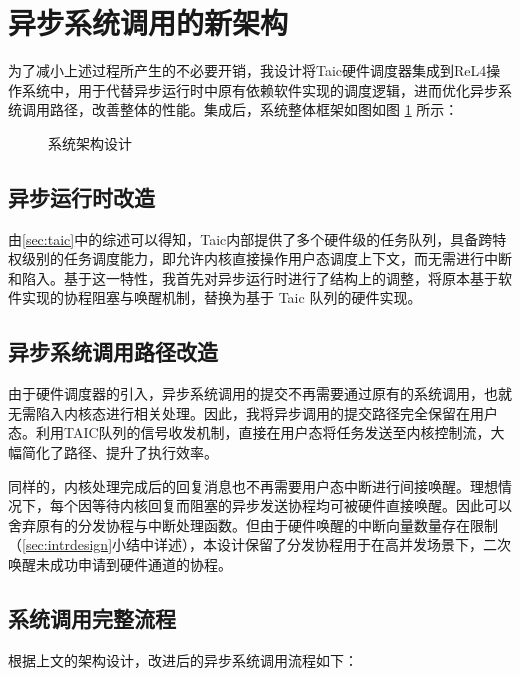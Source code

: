\section{异步系统调用的新架构}

为了减小上述过程所产生的不必要开销，我设计将Taic硬件调度器集成到ReL4操作系统中，用于代替异步运行时中原有依赖软件实现的调度逻辑，进而优化异步系统调用路径，改善整体的性能。集成后，系统整体框架如图如图 \ref{taicsyscall} 所示：

\begin{figure}[htbp]
    \centering
    
    \caption{系统架构设计}\label{taicsyscall}
\end{figure}

\subsection{异步运行时改造}

由\ref{sec:taic}中的综述可以得知，Taic内部提供了多个硬件级的任务队列，具备跨特权级别的任务调度能力，即允许内核直接操作用户态调度上下文，而无需进行中断和陷入。基于这一特性，我首先对异步运行时进行了结构上的调整，将原本基于软件实现的协程阻塞与唤醒机制，替换为基于 Taic 队列的硬件实现。


\subsection{异步系统调用路径改造}

由于硬件调度器的引入，异步系统调用的提交不再需要通过原有的系统调用，也就无需陷入内核态进行相关处理。因此，我将异步调用的提交路径完全保留在用户态。利用TAIC队列的信号收发机制，直接在用户态将任务发送至内核控制流，大幅简化了路径、提升了执行效率。

同样的，内核处理完成后的回复消息也不再需要用户态中断进行间接唤醒。理想情况下，每个因等待内核回复而阻塞的异步发送协程均可被硬件直接唤醒。因此可以舍弃原有的分发协程与中断处理函数。但由于硬件唤醒的中断向量数量存在限制（\ref{sec:intrdesign}小结中详述），本设计保留了分发协程用于在高并发场景下，二次唤醒未成功申请到硬件通道的协程。

\subsection{系统调用完整流程}

根据上文的架构设计，改进后的异步系统调用流程如下：

